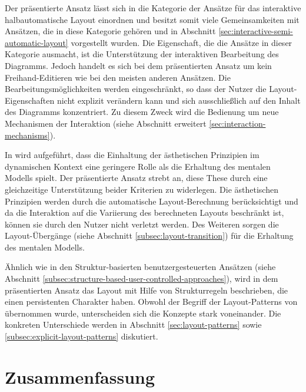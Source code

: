 Der präsentierte Ansatz lässt sich in die Kategorie der Ansätze für das interaktive halbautomatische Layout einordnen und besitzt somit viele Gemeinsamkeiten mit Ansätzen, die in diese Kategorie gehören und in Abschnitt \ref{sec:interactive-semi-automatic-layout} vorgestellt wurden. Die Eigenschaft, die die Ansätze in dieser Kategorie ausmacht, ist die Unterstützung der interaktiven Bearbeitung des Diagramms. Jedoch handelt es sich bei dem präsentierten Ansatz um kein Freihand-Editieren wie bei den meisten anderen Ansätzen. Die Bearbeitungsmöglichkeiten werden eingeschränkt, so dass der Nutzer die Layout-Eigenschaften nicht explizit verändern kann und sich ausschließlich auf den Inhalt des Diagramms konzentriert. Zu diesem Zweck wird die Bedienung um neue Mechanismen der Interaktion (siehe Abschnitt erweitert \ref{sec:interaction-mechanisms}).

In \cite[S.5]{Maier12A-Pattern-based} wird aufgeführt, dass die Einhaltung der ästhetischen Prinzipien im dynamischen Kontext eine geringere Rolle als die Erhaltung des mentalen Modells spielt. Der präsentierte Ansatz strebt an, diese These durch eine gleichzeitige Unterstützung beider Kriterien zu widerlegen. Die ästhetischen Prinzipien werden durch die automatische Layout-Berechnung berücksichtigt und da die Interaktion auf die Variierung des berechneten Layouts beschränkt ist, können sie durch den Nutzer nicht verletzt werden. Des Weiteren sorgen die Layout-Übergänge (siehe Abschnitt \ref{subsec:layout-transition}) für die Erhaltung des mentalen Modells.

Ähnlich wie in den Struktur-basierten benutzergesteuerten Ansätzen (siehe Abschnitt \ref{subsec:structure-based-user-controlled-approaches}), wird in dem präsentierten Ansatz das Layout mit Hilfe von Strukturregeln beschrieben, die einen persistenten Charakter haben. Obwohl der Begriff der Layout-Patterns von \cite{Maier12A-Pattern-based} übernommen wurde, unterscheiden sich die Konzepte stark voneinander. Die konkreten Unterschiede werden in Abschnitt \ref{sec:layout-patterns} sowie \ref{subsec:explicit-layout-patterns} diskutiert.


\section{Zusammenfassung}
\label{sec:approach-summary}


